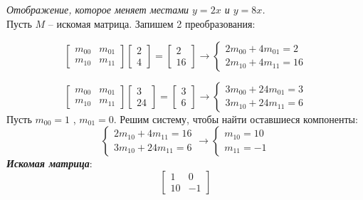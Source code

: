 \documentclass[a5paper, 10pt]{article}
\theoremstyle{definition}
\theoremstyle{plain}
\theoremstyle{remark}
\begin{document}
\subsection{}
\textit{Отображение, которое меняет местами $y=2x$ и $y=8x$.}\\
Пусть $M$ -- искомая матрица. Запишем 2 преобразования:

\begin{equation}
\begin{bmatrix}
m_{0 0} & m_{0 1}\\
m_{1 0} & m_{1 1}
\end{bmatrix}
\begin{bmatrix}
2\\
4
\end{bmatrix}
=
\begin{bmatrix}
2\\
16
\end{bmatrix}
\to
\begin{cases}
2m_{0 0} + 4m_{0 1} = 2\\
2m_{1 0} + 4m_{1 1} = 16
\end{cases}
\end{equation}

\begin{equation}
\begin{bmatrix}
m_{0 0} & m_{0 1}\\
m_{1 0} & m_{1 1}
\end{bmatrix}
\begin{bmatrix}
3\\
24
\end{bmatrix}
=
\begin{bmatrix}
3\\
6
\end{bmatrix}
\to
\begin{cases}
3m_{0 0} + 24m_{0 1} = 3\\
3m_{1 0} + 24m_{1 1} = 6
\end{cases}
\end{equation}
Пусть $ m_{0 0} = 1$ , $m_{0 1} = 0$. Решим систему, чтобы найти оставшиеся компоненты:
\begin{equation}
\begin{cases}
2m_{1 0} + 4m_{1 1} = 16\\
3m_{1 0} + 24m_{1 1} = 6
\end{cases}
\to
\begin{cases}
m_{1 0} = 10\\
m_{1 1} = -1
\end{cases}
\end{equation}
\textit{\textbf{Искомая матрица}}:
\begin{equation}
\begin{bmatrix}
1 &  0\\
10 & -1
\end{bmatrix}
\end{equation}
\end{document}

